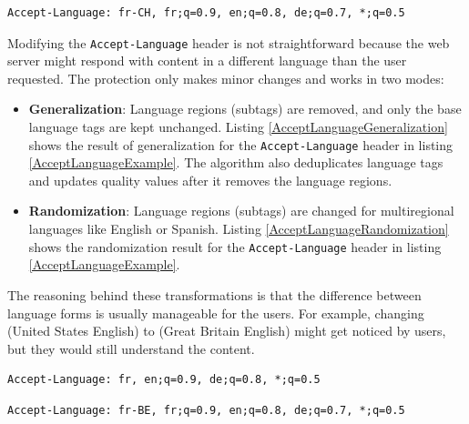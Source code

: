 \begin{lstlisting}[caption={An example of Accept-Language header contents \cite{MDN}.}, label={AcceptLanguageExample}]
Accept-Language: fr-CH, fr;q=0.9, en;q=0.8, de;q=0.7, *;q=0.5
\end{lstlisting}

\medbreak

Modifying the \texttt{Accept-Language} header is not straightforward because the web server might respond with content in a different language than the user requested. The protection only makes minor changes and works in two modes:

\begin{itemize}
	\item \textbf{Generalization}: Language regions (subtags) are removed, and only the base language tags are kept unchanged. Listing \ref{AcceptLanguageGeneralization} shows the result of generalization for the \texttt{Accept-Language} header in listing \ref{AcceptLanguageExample}. The algorithm also deduplicates language tags and updates quality values after it removes the language regions.
	\item \textbf{Randomization}: Language regions (subtags) are changed for multiregional languages like English or Spanish. Listing \ref{AcceptLanguageRandomization} shows the randomization result for the \texttt{Accept-Language} header in listing \ref{AcceptLanguageExample}.
\end{itemize}

The reasoning behind these transformations is that the difference between language forms is usually manageable for the users. For example, changing  (United States English) to  (Great Britain English) might get noticed by users, but they would still understand the content.

\bigbreak

\begin{lstlisting}[caption={The result of the \uv{generalization} mode transformation of listing \ref{AcceptLanguageExample}.}, label={AcceptLanguageGeneralization}]
Accept-Language: fr, en;q=0.9, de;q=0.8, *;q=0.5
\end{lstlisting}

\begin{lstlisting}[caption={The result of the \uv{randomization} mode transformation of listing \ref{AcceptLanguageExample}.}, label={AcceptLanguageRandomization}]
Accept-Language: fr-BE, fr;q=0.9, en;q=0.8, de;q=0.7, *;q=0.5
\end{lstlisting}


